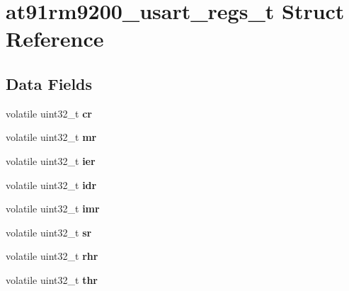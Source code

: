 \hypertarget{structat91rm9200__usart__regs__t}{}\section{at91rm9200\+\_\+usart\+\_\+regs\+\_\+t Struct Reference}
\label{structat91rm9200__usart__regs__t}
\subsection*{Data Fields}
\begin{DoxyCompactItemize}
\item 
\mbox{\label{structat91rm9200__usart__regs__t_ab797478752757bc9bcc7697ad79f496d}} 
volatile uint32\+\_\+t {\bfseries cr}
\item 
\mbox{\label{structat91rm9200__usart__regs__t_a18d8aa4d4847303f314d328a9e52fd1f}} 
volatile uint32\+\_\+t {\bfseries mr}
\item 
\mbox{\label{structat91rm9200__usart__regs__t_ab0f5aee3dd9234c801d7f86c37047c89}} 
volatile uint32\+\_\+t {\bfseries ier}
\item 
\mbox{\label{structat91rm9200__usart__regs__t_abcd502da4563b9efc0188fdf92b339b3}} 
volatile uint32\+\_\+t {\bfseries idr}
\item 
\mbox{\label{structat91rm9200__usart__regs__t_abdb1ce2a0620a64af612da1abf8ce95a}} 
volatile uint32\+\_\+t {\bfseries imr}
\item 
\mbox{\label{structat91rm9200__usart__regs__t_af96a0c41b806add02ed2ce8366d98e30}} 
volatile uint32\+\_\+t {\bfseries sr}
\item 
\mbox{\label{structat91rm9200__usart__regs__t_ae860cc4ee3f5cfca60f391ba4ae086a3}} 
volatile uint32\+\_\+t {\bfseries rhr}
\item 
\mbox{\label{structat91rm9200__usart__regs__t_ae69d030f5813af715597a5f3239c3cee}} 
volatile uint32\+\_\+t {\bfseries thr}

\end{DoxyCompactItemize}
